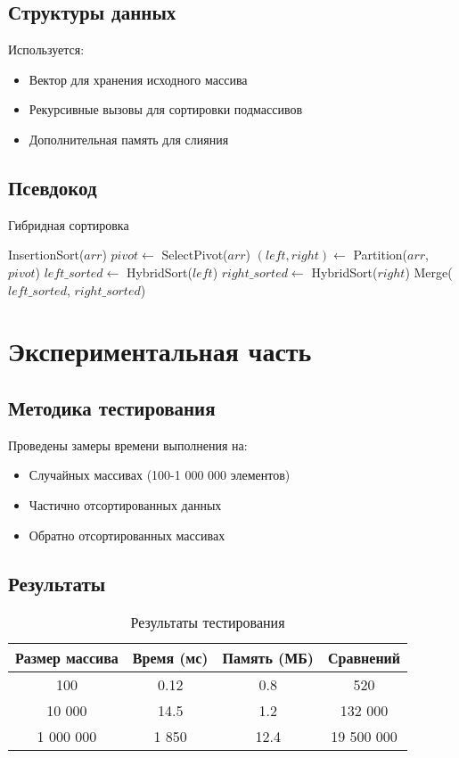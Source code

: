 \documentclass[a4paper,12pt]{article}
\begin{document}
\subsection{Структуры данных}
Используется:
\begin{itemize}
    \item Вектор для хранения исходного массива
    \item Рекурсивные вызовы для сортировки подмассивов
    \item Дополнительная память для слияния
\end{itemize}

\subsection{Псевдокод}
\begin{algorithm}[H]
\caption{Гибридная сортировка}
\begin{algorithmic}[1]
        \State \Return InsertionSort($arr$)
    \EndIf
    \State $pivot \gets$ SelectPivot($arr$)
    \State $(left, right) \gets$ Partition($arr$, $pivot$)
    \State $left\_sorted \gets$ HybridSort($left$)
    \State $right\_sorted \gets$ HybridSort($right$)
    \State \Return Merge($left\_sorted$, $right\_sorted$)
\EndFunction
\end{algorithmic}
\end{algorithm}

\section{Экспериментальная часть}
\subsection{Методика тестирования}
Проведены замеры времени выполнения на:
\begin{itemize}
    \item Случайных массивах (100-1 000 000 элементов)
    \item Частично отсортированных данных
    \item Обратно отсортированных массивах
\end{itemize}

\subsection{Результаты}
\begin{table}[h]
\centering
\begin{tabular}{|c|c|c|c|}
\hline
Размер массива & Время (мс) & Память (МБ) & Сравнений \\
\hline
100 & 0.12 & 0.8 & 520 \\
10 000 & 14.5 & 1.2 & 132 000 \\
1 000 000 & 1 850 & 12.4 & 19 500 000 \\
\hline
\end{tabular}
\caption{Результаты тестирования}
\end{table}
\end{document}
